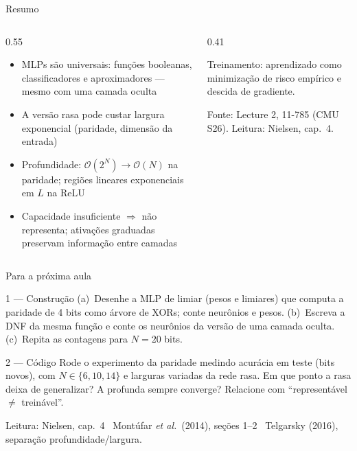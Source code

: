 \documentclass[aspectratio=169, 11pt]{beamer}
\begin{document}
\begin{frame}{Resumo}

  \begin{columns}[T]
    \begin{column}{0.55\textwidth}
      \begin{itemize}\setlength{\itemsep}{0.35ex}
        \item MLPs são universais: funções booleanas, classificadores e
              aproximadores — mesmo com uma camada oculta
        \item A versão rasa pode custar largura exponencial (paridade,
              dimensão da entrada)
        \item Profundidade: $\mathcal{O}(2^N) \to \mathcal{O}(N)$ na
              paridade; regiões lineares exponenciais em $L$ na ReLU
        \item Capacidade insuficiente $\Rightarrow$ não representa;
              ativações graduadas preservam informação entre camadas
      \end{itemize}
    \end{column}
    \begin{column}{0.41\textwidth}
      \begin{tcolorbox}[iccaixa=icVerde, title={Próxima aula}]
        Treinamento: aprendizado como minimização de risco empírico e
        descida de gradiente.
      \end{tcolorbox}
      \smallskip
      {\small\color{icCinza} Fonte: Lecture 2, 11-785 (CMU S26).
      Leitura: Nielsen, cap.\ 4.}
    \end{column}
  \end{columns}
\end{frame}

\begin{frame}{Para a próxima aula}

  \begin{exbox}{1 --- Construção}
    (a)~Desenhe a MLP de limiar (pesos e limiares) que computa a paridade de
    4 bits como árvore de XORs; conte neurônios e pesos.
    (b)~Escreva a DNF da mesma função e conte os neurônios da versão de uma
    camada oculta. (c)~Repita as contagens para $N = 20$ bits.
  \end{exbox}

  \begin{exbox}{2 --- Código}
    Rode o experimento da paridade medindo acurácia em teste (bits novos),
    com $N \in \{6, 10, 14\}$ e larguras variadas da rede rasa. Em que ponto
    a rasa deixa de generalizar? A profunda sempre converge? Relacione com
    ``representável $\ne$ treinável''.
  \end{exbox}

  \medskip
  {\small\color{icCinza}
  Leitura: Nielsen, cap.\ 4 \textbullet\ Montúfar \emph{et al.}\ (2014),
  seções 1--2 \textbullet\ Telgarsky (2016), separação profundidade/largura.}
\end{frame}
\end{document}
